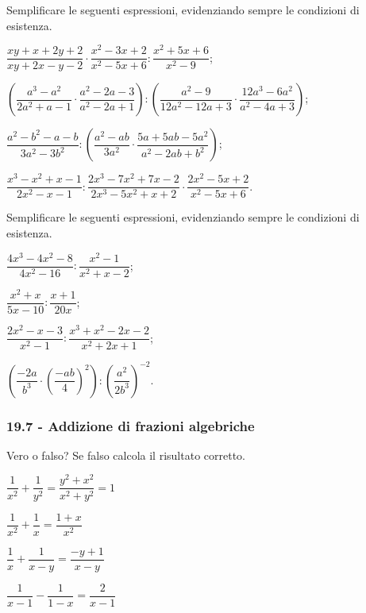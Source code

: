 \begin{esercizio}[\Ast]
\label{ese:19.20}
Semplificare le seguenti espressioni, evidenziando sempre le condizioni di esistenza.
\begin{enumeratea}
 \item $\dfrac{xy+x+2y+2}{xy+2x-y-2}\cdot\dfrac{x^{2}-3x+2}{x^{2}-5x+6}:\dfrac{x^{2}+5x+6}{x^{2}-9}$;
 \item $\left(\dfrac{a^{3}-a^{2}}{2a^{2}+a-1}\cdot\dfrac{a^{2}-2a-3}{a^{2}-2a+1}\right):\left(\dfrac{a^{2}-9}{12a^{2}-12a+3}\cdot\dfrac{12a^{3}-6a^{2}}{a^{2}-4a+3}\right)$;
 \item $\dfrac{a^{2}-b^{2}-a-b}{3a^{2}-3b^{2}}:\left(\dfrac{a^{2}-ab}{3a^{2}}\cdot\dfrac{5a+5ab-5a^{2}}{a^{2}-2ab+b^{2}}\right)$;
 \item $\dfrac{x^{3}-x^{2}+x-1}{2x^{2}-x-1}:\dfrac{2x^{3}-7x^{2}+7x-2}{2x^{3}-5x^{2}+x+2}\cdot\dfrac{2x^{2}-5x+2}{x^{2}-5x+6}$.%
\end{enumeratea}
\end{esercizio}

\begin{esercizio}
\label{ese:19.21}
Semplificare le seguenti espressioni, evidenziando sempre le condizioni di esistenza.
\begin{multicols}{2}
\begin{enumeratea}
 \item $\dfrac{4x^{3}-4x^{2}-8}{4x^{2}-16}:\dfrac{x^{2}-1}{x^{2}+x-2}$;
 \item $\dfrac{x^{2}+x}{5x-10}:\dfrac{x+1}{20x}$;
 \item $\dfrac{2x^{2}-x-3}{x^{2}-1}:\dfrac{x^{3}+x^{2}-2x-2}{x^{2}+2x+1}$;
 \item $\left(\dfrac{-{2a}}{b^{3}}\cdot\left(\dfrac{-{ab}}{4}\right)^{2}\right):\left(\dfrac{a^{2}}{2b^{3}}\right)^{-2}$.%
\end{enumeratea}
\end{multicols}
\end{esercizio}

\subsubsection*{19.7 - Addizione di frazioni algebriche}

\begin{esercizio}
\label{ese:19.22}
Vero o falso? Se falso calcola il risultato corretto.
\begin{multicols}{2}
\TabPositions{4cm}
\begin{enumeratea}
 \item $\dfrac{1}{x^{2}}+\dfrac{1}{y^{2}}=\dfrac{y^{2}+x^{2}}{x^{2}+y^{2}}=1$ \tab\boxV\quad\boxF
 \item $\dfrac{1}{x^{2}}+\dfrac{1}{x}=\dfrac{1+x}{x^{2}}$ \tab\boxV\quad\boxF
 \item $\dfrac{1}{x}+\dfrac{1}{x-y}=\dfrac{-y+1}{x-y}$ \tab\boxV\quad\boxF
 \item $\dfrac{1}{x-1}-\dfrac{1}{1-x}=\dfrac{2}{x-1}$ \tab\boxV\quad\boxF
\end{enumeratea}
\end{multicols}
\end{esercizio}

